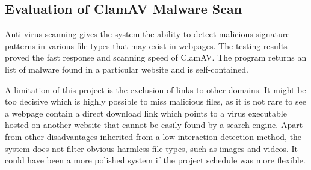 \subsection{Evaluation of ClamAV Malware Scan}
Anti-virus scanning gives the system the ability to detect malicious 
signature patterns in various file types that may exist in webpages. The 
testing results proved the fast response and scanning speed of ClamAV. The 
program returns an list of malware found in a particular website and 
is self-contained.

A limitation 
of this project is the exclusion of links to other domains. It might be too 
decisive which is highly possible to miss malicious files, as it is 
not rare to see a webpage contain a direct download link which points to a 
virus executable hosted on another website that cannot be easily found by 
a search engine. Apart from other disadvantages inherited from a low interaction 
detection method, the system does not filter obvious 
harmless file types, such as images and videos. It could have been a more polished system if 
the project schedule was more flexible.

